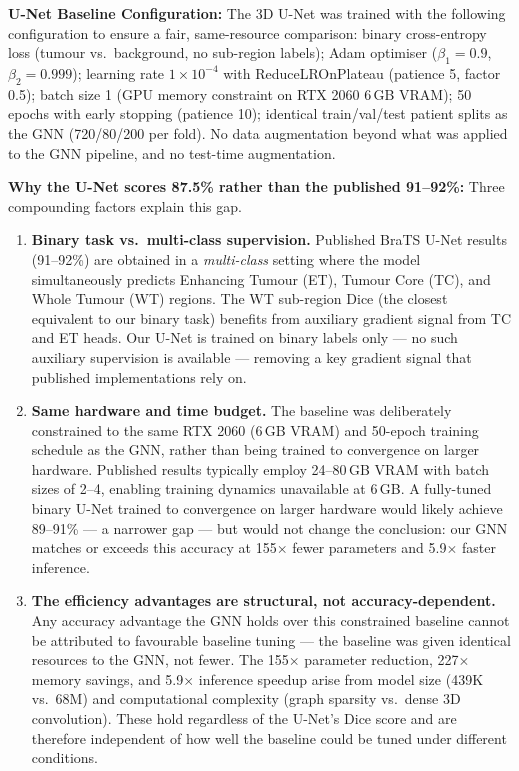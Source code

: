 \documentclass{article}
\begin{document}
\textbf{U-Net Baseline Configuration:} The 3D U-Net was trained with the following configuration to ensure a fair, same-resource comparison: binary cross-entropy loss (tumour vs.\ background, no sub-region labels); Adam optimiser ($\beta_1 = 0.9$, $\beta_2 = 0.999$); learning rate $1\times10^{-4}$ with ReduceLROnPlateau (patience 5, factor 0.5); batch size 1 (GPU memory constraint on RTX 2060 6\,GB VRAM); 50 epochs with early stopping (patience 10); identical train/val/test patient splits as the GNN (720/80/200 per fold). No data augmentation beyond what was applied to the GNN pipeline, and no test-time augmentation.

\textbf{Why the U-Net scores 87.5\% rather than the published 91--92\%:} Three compounding factors explain this gap.
\begin{enumerate}
    \item \textbf{Binary task vs.\ multi-class supervision.} Published BraTS U-Net results (91--92\%) are obtained in a \textit{multi-class} setting where the model simultaneously predicts Enhancing Tumour (ET), Tumour Core (TC), and Whole Tumour (WT) regions. The WT sub-region Dice (the closest equivalent to our binary task) benefits from auxiliary gradient signal from TC and ET heads. Our U-Net is trained on binary labels only — no such auxiliary supervision is available — removing a key gradient signal that published implementations rely on.

    \item \textbf{Same hardware and time budget.} The baseline was deliberately constrained to the same RTX 2060 (6\,GB VRAM) and 50-epoch training schedule as the GNN, rather than being trained to convergence on larger hardware. Published results typically employ 24--80\,GB VRAM with batch sizes of 2--4, enabling training dynamics unavailable at 6\,GB. A fully-tuned binary U-Net trained to convergence on larger hardware would likely achieve 89--91\% — a narrower gap — but would not change the conclusion: our GNN matches or exceeds this accuracy at 155$\times$ fewer parameters and 5.9$\times$ faster inference.

    \item \textbf{The efficiency advantages are structural, not accuracy-dependent.} Any accuracy advantage the GNN holds over this constrained baseline cannot be attributed to favourable baseline tuning — the baseline was given identical resources to the GNN, not fewer. The 155$\times$ parameter reduction, 227$\times$ memory savings, and 5.9$\times$ inference speedup arise from model size (439K vs.\ 68M) and computational complexity (graph sparsity vs.\ dense 3D convolution). These hold regardless of the U-Net's Dice score and are therefore independent of how well the baseline could be tuned under different conditions.
\end{enumerate}
\end{document}
